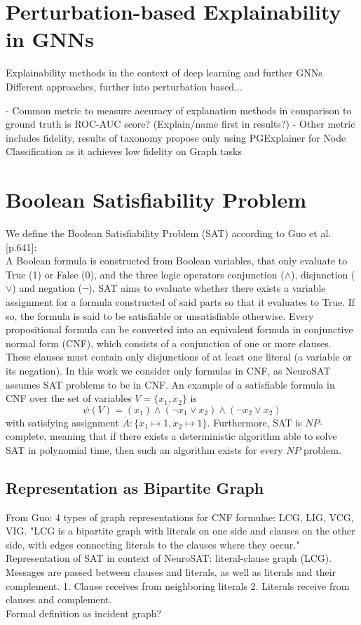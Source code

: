 \section{Perturbation-based Explainability in GNNs}
Explainability methods in the context of deep learning and further GNNs \\
Different approaches, further into perturbation based... \bigskip

- Common metric to measure accuracy of explanation methods in comparison to ground truth is ROC-AUC score? (Explain/name first in results?)
- Other metric includes fidelity, results of taxonomy propose only using PGExplainer for Node Classification as it achieves low fidelity on Graph tasks

\section{Boolean Satisfiability Problem}
We define the Boolean Satisfiability Problem (SAT) according to Guo et al.\cite{guo2023machine}[p.641]: \\
A Boolean formula is constructed from Boolean variables, that only evaluate to True (1) or False (0), and the three logic operators conjunction ($\wedge$), disjunction ($\vee$) and negation ($\neg$). SAT aims to evaluate whether there exists a variable assignment for a formula constructed of said parts so that it evaluates to True. If so, the formula is said to be satisfiable or unsatisfiable otherwise. Every propositional formula can be converted into an equivalent formula in conjunctive normal form (CNF), which consists of a conjunction of one or more clauses. These clauses must contain only disjunctions of at least one literal (a variable or its negation). In this work we consider only formulas in CNF, as NeuroSAT\cite{} assumes SAT problems to be in CNF. An example of a satisfiable formula in CNF over the set of variables $V=\{x_1,x_2\}$ is 
$$\psi(V) = (x_1) \land (\neg x_1 \lor x_2) \land (\neg x_2 \lor x_2)$$
with satisfying assignment $A:\{x_1 \mapsto 1, x_2 \mapsto 1\}$. Furthermore, SAT is $NP$-complete, meaning that if there exists a deterministic algorithm able to solve SAT in polynomial time, then such an algorithm exists for every $NP$ problem.

\subsection{Representation as Bipartite Graph}
From Guo: 4 types of graph representations for CNF formulae: LCG, LIG, VCG, VIG.
"LCG is a bipartite graph with literals on one side and clauses on the other side, with edges connecting literals to the clauses where they occur."
Representation of SAT in context of NeuroSAT: literal-clause graph (LCG). Messages are passed between clauses and literals, as well as literals and their complement. 1. Clause receives from neighboring literals 2. Literals receive from clauses and complement. \\
Formal definition as incident graph?

